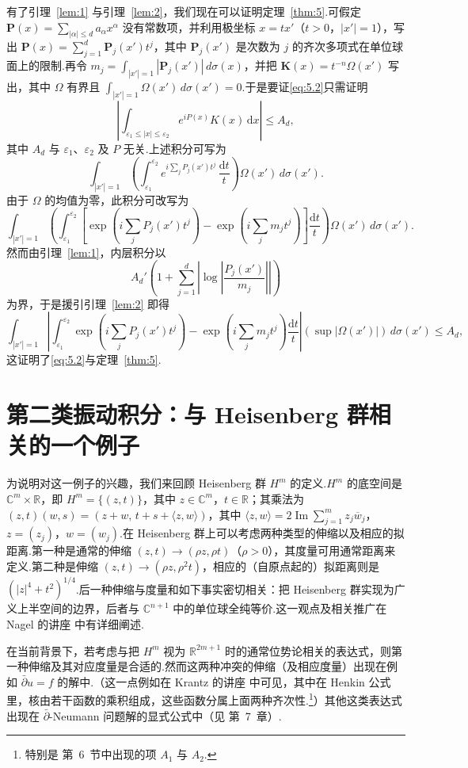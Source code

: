 \documentclass[
  BookTitleCN={傅里叶分析中的振动积分},
  BookTitleEN={Oscillatory Integrals in Fourier Analysis},
  OriginalAuthor={E.~M. Stein},
  OriginalEdition={Proc. Sympos. Pure Math. 35, Part~1},
  OriginalPublisher={American Mathematical Society},
  OriginalYear={1979},
  Translator={翻译及重排},
  ModelUsed={Codex CLI},
  Biblatex=false,
  TranslationDate={2026年8月27日}
]{mathtranslation}
\numberwithin{equation}{chapter}   %
\newcommand{\R}{\mathbb{R}}
\newcommand{\C}{\mathbb{C}}
\begin{document}
\noindent 有了引理~\ref{lem:1} 与引理~\ref{lem:2}，我们现在可以证明定理~\ref{thm:5}.可假定 $\mathbf{P}(x)=\sum_{|\alpha|\leq d}a_{\alpha}x^{\alpha}$ 没有常数项，并利用极坐标 $x=tx'$（$t>0$，$|x'|=1$），写出 $\mathbf{P}(x)=\sum_{j=1}^{d}\mathbf{P}_{j}(x')t^{j}$，其中 $\mathbf{P}_{j}(x')$ 是次数为 $j$ 的齐次多项式在单位球面上的限制.再令 $m_{j}=\int_{|x'|=1}|\mathbf{P}_{j}(x')|\,d\sigma(x)$，并把 $\mathbf{K}(x)=t^{-n}\Omega(x')$ 写出，其中 $\Omega$ 有界且 $\int_{|x'|=1}\Omega(x')\,d\sigma(x')=0$.于是要证\eqref{eq:5.2}只需证明
\[
  \left|\int_{\varepsilon_{1}\leq|x|\leq\varepsilon_{2}}e^{iP(x)}K(x)\,\mathrm{d}x\right|\leq A_{d},
\]
其中 $A_{d}$ 与 $\varepsilon_{1}$、$\varepsilon_{2}$ 及 $P$ 无关.上述积分可写为
\[
  \int_{|x'|=1}\left(\int_{\varepsilon_{1}}^{\varepsilon_{2}}e^{i\sum_{j}P_{j}(x')t^{j}}\,\frac{\mathrm{d}t}{t}\right)\Omega(x')\,d\sigma(x') .
\]
由于 $\Omega$ 的均值为零，此积分可改写为
\[
  \int_{|x'|=1}\left(\int_{\varepsilon_{1}}^{\varepsilon_{2}}\left[\exp\left(i\sum_{j}P_{j}(x')t^{j}\right)-\exp\left(i\sum_{j}m_{j}t^{j}\right)\right]\frac{\mathrm{d}t}{t}\right)\Omega(x')\,d\sigma(x') .
\]
然而由引理~\ref{lem:1}，内层积分以
\[
  A_{d}'\left(1+\sum_{j=1}^{d}\left|\log\left|\frac{P_{j}(x')}{m_{j}}\right|\right|\right)
\]
为界，于是援引引理~\ref{lem:2} 即得
\[
  \int_{|x'|=1}\left|\int_{\varepsilon_{1}}^{\varepsilon_{2}}\exp\left(i\sum_{j}P_{j}(x')t^{j}\right)-\exp\left(i\sum_{j}m_{j}t^{j}\right)\frac{\mathrm{d}t}{t}\right|(\sup|\Omega(x')|)\,d\sigma(x')\leq A_{d},
\]
这证明了\eqref{eq:5.2}与定理~\ref{thm:5}.
\chapter{第二类振动积分：与 Heisenberg 群相关的一个例子}

\noindent 为说明对这一例子的兴趣，我们来回顾 Heisenberg 群 $H^{m}$ 的定义.$H^{m}$ 的底空间是 $\C^{m}\times\R$，即 $H^{m}=\{(z,t)\}$，其中 $z\in\C^{m}$，$t\in\R$；其乘法为 $(z,t)(w,s)=(z+w,\,t+s+\langle z,w\rangle)$，其中 $\langle z,w\rangle=2\operatorname{Im}\sum_{j=1}^{m}z_{j}\overline{w}_{j}$，$z=(z_{j})$，$w=(w_{j})$.在 Heisenberg 群上可以考虑两种类型的伸缩以及相应的拟距离.第一种是通常的伸缩 $(z,t)\to(\rho z,\rho t)$（$\rho>0$），其度量可用通常距离来定义.第二种是伸缩 $(z,t)\to(\rho z,\rho^{2}t)$，相应的（自原点起的）拟距离则是 $(|z|^{4}+t^{2})^{1/4}$.后一种伸缩与度量和如下事实密切相关：把 Heisenberg 群实现为广义上半空间的边界，后者与 $\C^{n+1}$ 中的单位球全纯等价.这一观点及相关推广在 Nagel 的讲座 \cite{ref21} 中有详细阐述.

在当前背景下，若考虑与把 $H^{m}$ 视为 $\R^{2m+1}$ 时的通常位势论相关的表达式，则第一种伸缩及其对应度量是合适的.然而这两种冲突的伸缩（及相应度量）出现在例如 $\bar{\partial}u=f$ 的解中.（这一点例如在 Krantz 的讲座 \cite{ref17} 中可见，其中在 Henkin 公式里，核由若干函数的乘积组成，这些函数分属上面两种齐次性.\footnote{特别是 \cite{ref17} 第~6~节中出现的项 $A_{1}$ 与 $A_{2}$.}）其他这类表达式出现在 $\bar{\partial}$-Neumann 问题解的显式公式中（见 \cite{ref1} 第~7~章）.
\end{document}
